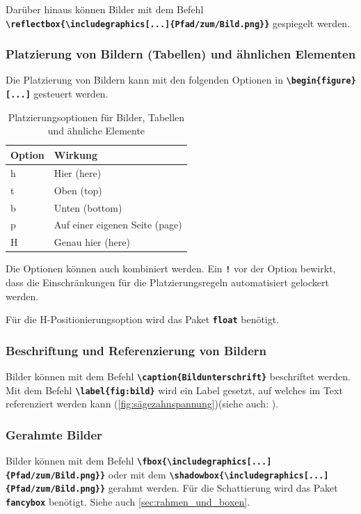 Darüber hinaus können Bilder mit dem Befehl \texttt{\textbf{\textbackslash reflectbox\{\textbackslash includegraphics[...]\{Pfad/zum/Bild.png\}\}}} gespiegelt werden.

\subsubsection{Platzierung von Bildern (Tabellen) und ähnlichen Elementen}
Die Platzierung von Bildern kann mit den folgenden Optionen in \textbf{\texttt{\textbackslash begin\{figure\}[...]}} gesteuert werden.

\begin{table}[H]
    \centering
    \begin{tabular}{ll}
        \toprule
        \textbf{Option} & \textbf{Wirkung}               \\
        \midrule
        h               & Hier (here)                    \\
        t               & Oben (top)                     \\
        b               & Unten (bottom)                 \\
        p               & Auf einer eigenen Seite (page) \\
        H               & Genau hier (here)              \\
        \bottomrule
    \end{tabular}
    \caption{Platzierungsoptionen für Bilder, Tabellen und ähnliche Elemente}
    \label{tab:figure_options}
\end{table}
Die Optionen können auch kombiniert werden. Ein \textbf{\texttt{!}} vor der Option bewirkt, dass die Einschränkungen für die Platzierungsregeln automatisiert gelockert werden.

Für die H-Positionierungsoption wird das Paket \textbf{\texttt{float}} benötigt.

\subsubsection{Beschriftung und Referenzierung von Bildern}
Bilder können mit dem Befehl \textbf{\texttt{\textbackslash caption\{Bildunterschrift\}}} beschriftet werden. Mit dem Befehl \textbf{\texttt{\textbackslash label\{fig:bild\}}} wird ein Label gesetzt, auf welches im Text referenziert werden kann (\autoref{fig:sägezahnspannung})(siehe auch: ).

\subsubsection{Gerahmte Bilder}
Bilder können mit dem Befehl \textbf{\texttt{\textbackslash fbox\{\textbackslash includegraphics[...]\{Pfad/zum/Bild.png\}\}}} oder mit dem \textbf{\texttt{\textbackslash shadowbox\{\textbackslash includegraphics[...]\{Pfad/zum/Bild.png\}\}}} gerahmt werden. Für die Schattierung wird das Paket \textbf{\texttt{fancybox}} benötigt. Siehe auch \autoref{sec:rahmen_und_boxen}.

